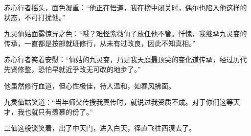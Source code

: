 \begin{this_body}
赤心行者摇头，面色凝重：“他正在悟道，我在榜中闭关时，偶尔也陷入他这样的状态，不可打扰他。”

九灵仙姑面露惊异之色：“哦？难怪紫薇仙子放任他不管。忏愧，我继承九灵变的传承，一直都是按部就班修行，从未有过改良，因此不知真相。”

赤心行者笑着安慰：“仙姑的九灵变，乃是我天庭最顶尖的变化道传承，经过历代先贤修整，恐怕早就近乎改无可改的地步了。”

他虽然修行血道，但心性极佳，待人温和，如春风拂面。

九灵仙姑笑道：“当年师父传授我真传时，就说过我资质不成。对于你们这等天才，我也就只有羡慕的份了。”

二仙这般谈笑着，出了中天门，进入白天，径直飞往西漠去了。

\end{this_body}

